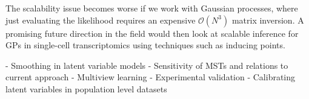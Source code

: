 The scalability issue becomes worse if we work with Gaussian processes, where just evaluating the likelihood requires an expensive $\mathcal{O}(N^3)$ matrix inversion. A promising future direction in the field would then look at scalable inference for GPs in single-cell transcriptomics using techniques such as inducing points.

- Smoothing in latent variable models
- Sensitivity of MSTs and relations to current approach
- Multiview learning
- Experimental validation
- Calibrating latent variables in population level datasets


